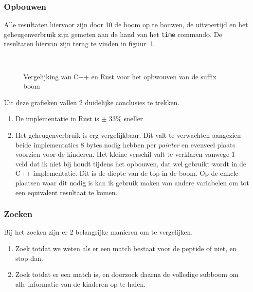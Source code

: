 \subsubsection{Opbouwen}
Alle resultaten hiervoor zijn door 10 de boom op te bouwen, de uitvoertijd en het geheugenverbruik zijn gemeten aan de hand van het \texttt{time} commando.
De resultaten hiervan zijn terug te vinden in figuur~\ref{fig:tree_building}.
\begin{figure}[H]
    \centering
    \\[4ex] %

    \caption{Vergelijking van C++ en Rust voor het opbwouven van de suffix boom}\label{fig:tree_building}
\end{figure}

Uit deze grafieken vallen 2 duidelijke conclusies te trekken.
\begin{enumerate}
    \item De implementatie in Rust is $\pm$ 33\% sneller
    \item Het geheugenverbruik is erg vergelijkbaar.
    Dit valt te verwachten aangezien beide implementaties 8 bytes nodig hebben per \textit{pointer} en evenveel plaats voorzien voor de kinderen.
    Het kleine verschil valt te verklaren vanwege 1 veld dat ik niet bij houdt tijdens het opbouwen, dat wel gebruikt wordt in de C++ implementatie.
    Dit is de diepte van de top in de boom.
    Op de enkele plaatsen waar dit nodig is kan ik gebruik maken van andere variabelen om tot een equivalent resultaat te komen.
\end{enumerate}

\subsubsection{Zoeken}
Bij het zoeken zijn er 2 belangrijke manieren om te vergelijken.
\begin{enumerate}
    \item Zoek totdat we weten als er een match bestaat voor de peptide of niet, en stop dan.

    \item Zoek totdat er een match is, en doorzoek daarna de volledige subboom om alle informatie van de kinderen op te halen.

\end{enumerate}

